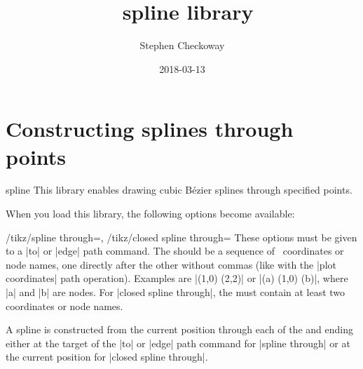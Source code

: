 \documentclass[a4paper]{ltxdoc}
\title{\tikzname\ spline library}
\author{Stephen Checkoway}
\date{2018-03-13}
\begin{document}
\maketitle

\section{Constructing splines through points}

\begin{tikzlibrary}{spline}
This library enables drawing cubic B\'ezier splines through specified points.
\end{tikzlibrary}

When you load this library, the following options become available:

\begin{keylist}{%
    /tikz/spline through=,
    /tikz/closed spline through=}
These options must be given to a |to| or |edge| path command. The
 should be a sequence of \tikzname\ coordinates or
node names, one directly after the other without commas (like with the
|plot coordinates| path operation). Examples are |(1,0) (2,2)| or
|(a) (1,0) (b)|, where |a| and |b| are nodes. For |closed spline through|, the
 must contain at least two coordinates or node
names.

A spline is constructed from the current position through each of the
 and ending either at the target of the |to| or |edge|
path command for |spline through| or at the current position for 
|closed spline through|.
\begin{codeexample}[]
\end{codeexample}

\begin{codeexample}[]
\end{codeexample}
\end{keylist}
\end{document}
